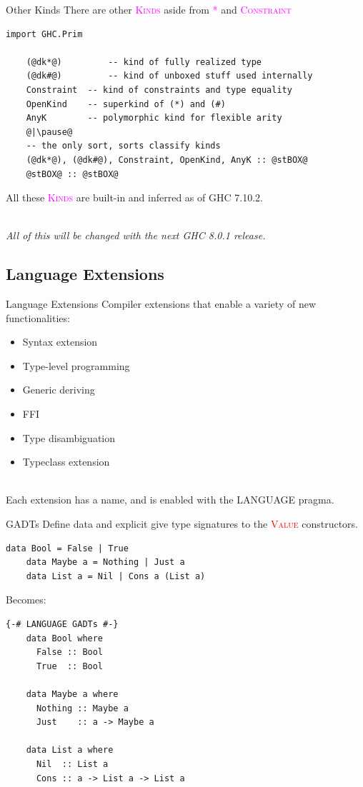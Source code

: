 \documentclass[xcolor={usenames,dvipsnames}]{beamer}
\newcommand{\hvalcon}[1]{\textcolor{Red}{\textsc{#1}}}
\newcommand{\hkind}[1]{\textcolor{Fuchsia}{\textsc{#1}}}
\begin{document}
\begin{frame}[fragile]{Other Kinds}
  There are other \hkind{Kinds} aside from \hkind{*} and \hkind{Constraint}
  \begin{lstlisting}[style=hask]
    import GHC.Prim
    
    (@dk*@)         -- kind of fully realized type
    (@dk#@)         -- kind of unboxed stuff used internally
    Constraint  -- kind of constraints and type equality
    OpenKind    -- superkind of (*) and (#)
    AnyK        -- polymorphic kind for flexible arity
    @|\pause@
    -- the only sort, sorts classify kinds
    (@dk*@), (@dk#@), Constraint, OpenKind, AnyK :: @stBOX@
    @stBOX@ :: @stBOX@
  \end{lstlisting}

  All these \hkind{Kinds} are built-in and inferred as of GHC 7.10.2.
  
  \ \\
  \textit{\tiny{All of this will be changed with the next GHC 8.0.1 release.}}
\end{frame}


\subsection{Language Extensions}

\begin{frame}[fragile]{Language Extensions}
  Compiler extensions that enable a variety of new functionalities:
  \begin{itemize}
    \item Syntax extension
    \item Type-level programming
    \item Generic deriving
    \item FFI
    \item Type disambiguation
    \item Typeclass extension
  \end{itemize}

  \ \\
  Each extension has a name, and is enabled with the LANGUAGE pragma.
\end{frame}

\begin{frame}[fragile]{GADTs}
  Define data and explicit give type signatures to the \hvalcon{Value} constructors.
  \begin{lstlisting}[style=hask]
    data Bool = False | True
    data Maybe a = Nothing | Just a
    data List a = Nil | Cons a (List a)
  \end{lstlisting}

  Becomes:
  \begin{lstlisting}[style=hask]
    {-# LANGUAGE GADTs #-}
    data Bool where
      False :: Bool
      True  :: Bool

    data Maybe a where
      Nothing :: Maybe a
      Just    :: a -> Maybe a

    data List a where
      Nil  :: List a
      Cons :: a -> List a -> List a
  \end{lstlisting}
\end{frame}
\end{document}
